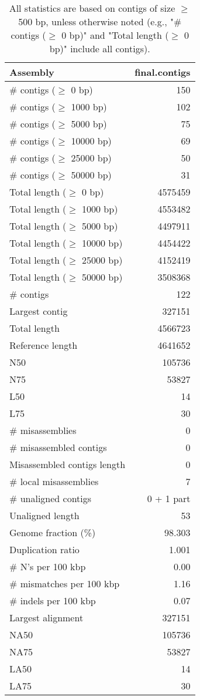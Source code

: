 \documentclass[12pt,a4paper]{article}
\begin{document}
\begin{table}[ht]
\begin{center}
\caption{All statistics are based on contigs of size $\geq$ 500 bp, unless otherwise noted (e.g., "\# contigs ($\geq$ 0 bp)" and "Total length ($\geq$ 0 bp)" include all contigs).}
\begin{tabular}{|l*{1}{|r}|}
\hline
Assembly & final.contigs \\ \hline
\# contigs ($\geq$ 0 bp) & 150 \\ \hline
\# contigs ($\geq$ 1000 bp) & 102 \\ \hline
\# contigs ($\geq$ 5000 bp) & 75 \\ \hline
\# contigs ($\geq$ 10000 bp) & 69 \\ \hline
\# contigs ($\geq$ 25000 bp) & 50 \\ \hline
\# contigs ($\geq$ 50000 bp) & 31 \\ \hline
Total length ($\geq$ 0 bp) & 4575459 \\ \hline
Total length ($\geq$ 1000 bp) & 4553482 \\ \hline
Total length ($\geq$ 5000 bp) & 4497911 \\ \hline
Total length ($\geq$ 10000 bp) & 4454422 \\ \hline
Total length ($\geq$ 25000 bp) & 4152419 \\ \hline
Total length ($\geq$ 50000 bp) & 3508368 \\ \hline
\# contigs & 122 \\ \hline
Largest contig & 327151 \\ \hline
Total length & 4566723 \\ \hline
Reference length & 4641652 \\ \hline
N50 & 105736 \\ \hline
N75 & 53827 \\ \hline
L50 & 14 \\ \hline
L75 & 30 \\ \hline
\# misassemblies & 0 \\ \hline
\# misassembled contigs & 0 \\ \hline
Misassembled contigs length & 0 \\ \hline
\# local misassemblies & 7 \\ \hline
\# unaligned contigs & 0 + 1 part \\ \hline
Unaligned length & 53 \\ \hline
Genome fraction (\%) & 98.303 \\ \hline
Duplication ratio & 1.001 \\ \hline
\# N's per 100 kbp & 0.00 \\ \hline
\# mismatches per 100 kbp & 1.16 \\ \hline
\# indels per 100 kbp & 0.07 \\ \hline
Largest alignment & 327151 \\ \hline
NA50 & 105736 \\ \hline
NA75 & 53827 \\ \hline
LA50 & 14 \\ \hline
LA75 & 30 \\ \hline
\end{tabular}
\end{center}
\end{table}
\end{document}
